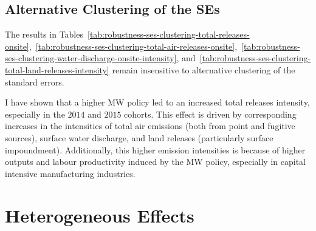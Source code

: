 \documentclass[12pt, english]{article}
\begin{document}
    \subsection{Alternative Clustering of the SEs}\label{subsec:alternative-clustering-of-the-ses}
    The results in Tables~\ref{tab:robustness-ses-clustering-total-releases-onsite},~\ref{tab:robustness-ses-clustering-total-air-releases-onsite},~\ref{tab:robustness-ses-clustering-water-discharge-onsite-intensity}, and~\ref{tab:robustness-ses-clustering-total-land-releases-intensity} remain insensitive to alternative clustering of the standard errors.
    
    
    
    

    I have shown that a higher MW policy led to an increased total releases intensity, especially in the $2014$ and $2015$ cohorts. This effect is driven by corresponding increases in the intensities of total air emissions (both from point and fugitive sources), surface water discharge, and land releases (particularly surface impoundment). Additionally, this higher emission intensities is because of higher outputs and labour productivity induced by the MW policy, especially in capital intensive manufacturing industries.


    \section{Heterogeneous Effects}\label{sec:heterogeneous-effects}
\end{document}
